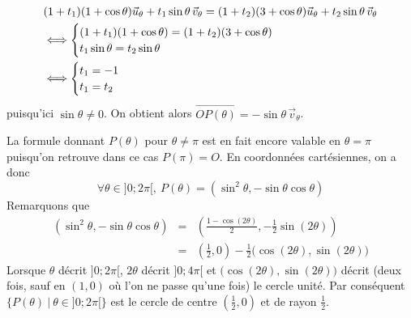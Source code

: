 {{\begin{itemize}
\begin{align*}
&(1+t_1)(1+\cos\theta)\vec{u}_\theta+t_1\sin\theta\,\vec{v}_\theta=(1+t_2)(3+\cos\theta)\vec{u}_\theta+t_2\sin\theta\,\vec{v}_\theta\\
&\Longleftrightarrow \begin{cases}(1+t_1)(1+\cos\theta)=(1+t_2)(3+\cos\theta)\cr t_1\sin\theta=t_2\sin\theta\end{cases}\\
&\Longleftrightarrow \begin{cases}t_1=-1\cr t_1=t_2\end{cases}
\end{align*}
puisqu'ici $\sin\theta\not=0$. 
On obtient alors $\overrightarrow{OP(\theta)}=-\sin\theta\,\vec{v}_\theta$. 
\end{itemize}

La formule donnant $P(\theta)$ pour $\theta\not=\pi$ est en fait encore valable en $\theta=\pi$ puisqu'on retrouve dans ce cas $P(\pi)=O$. En coordonnées cartésiennes, on a donc
$$\forall\theta\in]0;2\pi[,\ P(\theta)=(\sin^2\theta, -\sin\theta\cos\theta)$$
Remarquons que 
\begin{eqnarray*}
(\sin^2\theta, -\sin\theta\cos\theta)&=&\left(\frac{1-\cos(2\theta)}{2},-\frac{1}{2}\sin(2\theta)\right)\\
 &=&\left(\frac{1}{2},0\right)-\frac{1}{2}\big(\cos(2\theta),\sin(2\theta)\big)
\end{eqnarray*}
Lorsque $\theta$ décrit $]0;2\pi[$, $2\theta$ décrit $]0;4\pi[$ et 
$\big(\cos(2\theta),\sin(2\theta)\big)$ décrit (deux fois, sauf en $(1,0)$ où l'on ne passe 
qu'une fois) le cercle unité. Par conséquent $\{P(\theta)\ |\ \theta\in]0;2\pi[\}$ 
est le cercle de centre $(\frac{1}{2},0)$ et de rayon $\frac{1}{2}$.

\begin{center}
\end{center}}}

